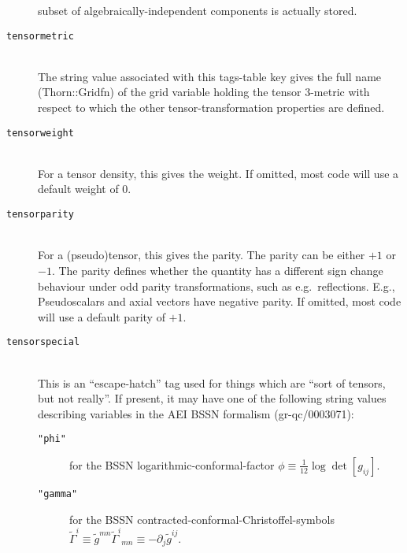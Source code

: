 \begin{description}
	subset of algebraically-independent components is actually stored.
\item[\texttt{tensormetric}]\mbox{}\\
	The string value associated with this tags-table key gives the
	full name (Thorn::Gridfn) of the grid variable holding the
	tensor 3-metric with respect to which the other tensor-transformation
	properties are defined.
\item[\texttt{tensorweight}]\mbox{}\\
	For a tensor density, this gives the weight.
	If omitted, most code will use a default weight of $0$.
\item[\texttt{tensorparity}]\mbox{}\\
	For a (pseudo)tensor, this gives the parity.
        The parity can be either $+1$ or $-1$.
        The parity defines whether the quantity has a different sign
        change behaviour under odd parity transformations, such as
        e.g.\ reflections.  E.g., Pseudoscalars and axial vectors have
        negative parity.
	If omitted, most code will use a default parity of $+1$.
\item[\texttt{tensorspecial}]\mbox{}\\
	This is an ``escape-hatch'' tag used for things which are
	``sort of tensors, but not really''.  If present, it may
	have one of the following string values describing variables
	in the AEI BSSN formalism (gr-qc/0003071):
	\begin{description}
	\item[\texttt{"phi"}]
		for the BSSN logarithmic-conformal-factor
		$\phi \equiv \frac{1}{12} \log \det [g_{ij}]$.
	\item[\texttt{"gamma"}]
		for the BSSN contracted-conformal-Christoffel-symbols
		$\tilde{\Gamma}^i \equiv \tilde{g}^{mn} \tilde{\Gamma}^i{}_{mn}
				  \equiv -\partial_j \tilde{g}^{ij}$.
	\end{description}
\end{description}

